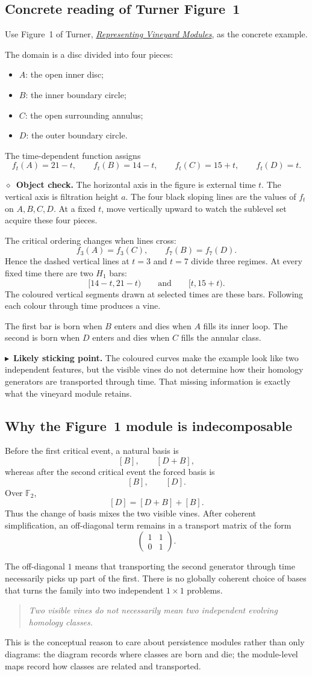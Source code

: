 \documentclass[11pt,a4paper]{article}
\newcommand{\planningbox}[2]{%
\subsection*{#1}
#2
}
\newcommand{\phrase}[1]{%
\begin{quote}
\emph{#1}
\end{quote}
}
\newcommand{\stickingpoint}[1]{%
\par\smallskip
\noindent\textcolor{red!65!black}{\(\blacktriangleright\)\ \textbf{Likely sticking point.}} #1
\par\smallskip
}
\newcommand{\objectcheck}[1]{%
\par\smallskip
\noindent\textcolor{green!45!black}{\(\diamond\)\ \textbf{Object check.}} #1
\par\smallskip
}
\begin{document}
\planningbox{Concrete reading of Turner Figure~1}{
Use Figure~1 of Turner,
\href{https://arxiv.org/abs/2307.06020}{\emph{Representing Vineyard Modules}},
as the concrete example.

The domain is a disc divided into four pieces:
\begin{itemize}
    \item \(A\): the open inner disc;
    \item \(B\): the inner boundary circle;
    \item \(C\): the open surrounding annulus;
    \item \(D\): the outer boundary circle.
\end{itemize}
The time-dependent function assigns
\[
f_t(A)=21-t,\qquad f_t(B)=14-t,\qquad
f_t(C)=15+t,\qquad f_t(D)=t.
\]

\objectcheck{The horizontal axis in the figure is external time \(t\). The
vertical axis is filtration height \(a\). The four black sloping lines are the
values of \(f_t\) on \(A,B,C,D\). At a fixed \(t\), move vertically upward to
watch the sublevel set acquire these four pieces.}

The critical ordering changes when lines cross:
\[
f_3(A)=f_3(C),\qquad f_7(B)=f_7(D).
\]
Hence the dashed vertical lines at \(t=3\) and \(t=7\) divide three regimes.
At every fixed time there are two \(H_1\) bars:
\[
[14-t,21-t)
\qquad\text{and}\qquad
[t,15+t).
\]
The coloured vertical segments drawn at selected times are these bars.
Following each colour through time produces a vine.

The first bar is born when \(B\) enters and dies when \(A\) fills its inner
loop. The second is born when \(D\) enters and dies when \(C\) fills the
annular class.

\stickingpoint{The coloured curves make the example look like two independent
features, but the visible vines do not determine how their homology generators
are transported through time. That missing information is exactly what the
vineyard module retains.}
}

\planningbox{Why the Figure~1 module is indecomposable}{
Before the first critical event, a natural basis is
\[
[B],\qquad[D+B],
\]
whereas after the second critical event the forced basis is
\[
[B],\qquad[D].
\]
Over \(\mathbb F_2\),
\[
[D]=[D+B]+[B].
\]
Thus the change of basis mixes the two visible vines. After coherent
simplification, an off-diagonal term remains in a transport matrix of the form
\[
\begin{pmatrix}
1&1\\
0&1
\end{pmatrix}.
\]

The off-diagonal \(1\) means that transporting the second generator through
time necessarily picks up part of the first. There is no globally coherent
choice of bases that turns the family into two independent \(1\times1\)
problems.

\phrase{Two visible vines do not necessarily mean two independent evolving
homology classes.}

This is the conceptual reason to care about persistence modules rather than
only diagrams: the diagram records where classes are born and die; the
module-level maps record how classes are related and transported.
}
\end{document}
